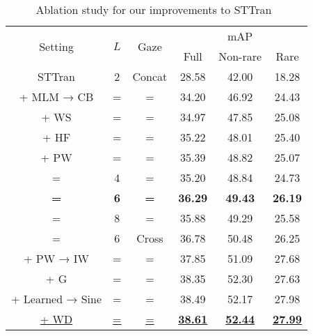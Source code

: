 \documentclass[times,twocolumn,final,authoryear]{elsarticle}
\begin{document}
\begin{table}
    \begin{subtable}[]{0.47\textwidth}
        \centering
        \small
        \begin{tabular}{|c|c|c|c c c|}
            \hline
            \multirow{2}{*}{Setting} & \multirow{2}{*}{$L$} & \multirow{2}{*}{Gaze} & \multicolumn{3}{c|}{mAP} \\
            \cline{4-6}
            & & & Full & Non-rare & Rare \\
            \hhline{|=|=|=|= = =|}
            STTran & 2 & Concat & 28.58 & 42.00 & 18.28 \\
            + MLM → CB & = & = & 34.20 & 46.92 & 24.43 \\
            + WS & = & = & 34.97 & 47.85 & 25.08 \\
            + HF & = & = & 35.22 & 48.01 & 25.40\\
            + PW & = & = & 35.39 & 48.82 & 25.07 \\
            = & 4 & = & 35.20 & 48.84 & 24.73 \\
            \textbf{=} & \textbf{6} & \textbf{=} & \textbf{36.29} & \textbf{49.43} & \textbf{26.19} \\
            = & 8 & = & 35.88 & 49.29 & 25.58 \\
            \hline
            = & 6 & Cross & 36.78 & 50.48 & 26.25 \\
            + PW → IW & = & = & 37.85 & 51.09 & 27.68 \\
            + G & = & = & 38.35 & 52.30 & 27.63 \\
            + Learned → Sine & = & = & 38.49 & 52.17 & 27.98 \\
            \underline{+ WD} & \underline{=} & \underline{=} & \underline{\textbf{38.61}} & \underline{\textbf{52.44}} & \underline{\textbf{27.99}} \\
            \hline
        \end{tabular}
        \caption{Ablation study for our improvements to STTran~\citep{hoi_v2:sttran}}
        \label{table:ablation_components}
    \end{subtable}


\end{table}
\end{document}
